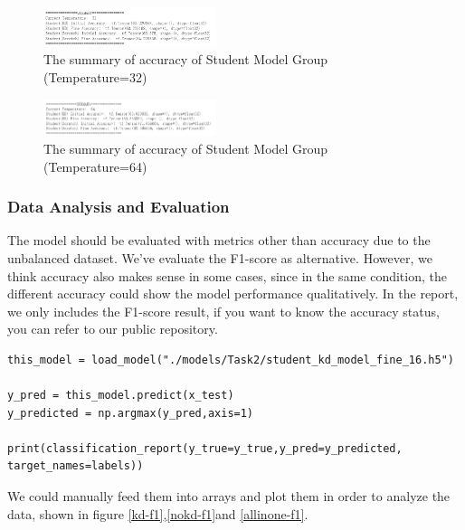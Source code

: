 \documentclass[conference]{IEEEtran}
\begin{document}
\begin{figure}[hbtp] 
    \centering
    \includegraphics[width=0.45\textwidth]{./graphs/Task2/t32_acc.png}
    \caption{The summary of accuracy of Student Model Group (Temperature=32)}
    \label{sum-t32}
\end{figure}

\begin{figure}[hbtp] 
    \centering
    \includegraphics[width=0.45\textwidth]{./graphs/Task2/t64_acc.png}
    \caption{The summary of accuracy of Student Model Group (Temperature=64)}
    \label{sum-t64}
\end{figure}

\subsubsection{Data Analysis and Evaluation}

The model should be evaluated with metrics other than accuracy due to the unbalanced dataset. We've evaluate the F1-score as alternative. However, we think accuracy also makes sense in some cases, since in the same condition, the different accuracy could show the model performance qualitatively. In the report, we only includes the F1-score result, if you want to know the accuracy status, you can refer to our public repository.


\begin{lstlisting}
this_model = load_model("./models/Task2/student_kd_model_fine_16.h5")

y_pred = this_model.predict(x_test)
y_predicted = np.argmax(y_pred,axis=1)

print(classification_report(y_true=y_true,y_pred=y_predicted, target_names=labels))
\end{lstlisting}

We could manually feed them into arrays and plot them in order to analyze the data, shown in figure \ref{kd-f1},\ref{nokd-f1}and \ref{allinone-f1}.
\end{document}
